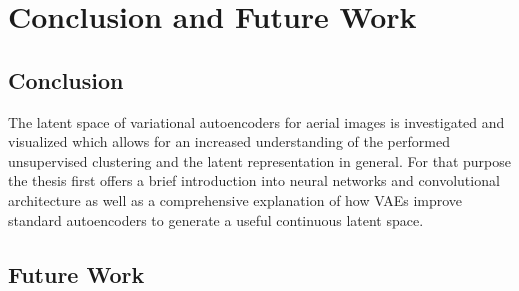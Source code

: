 \section{Conclusion and Future Work}
\subsection{Conclusion}

The latent space of variational autoencoders for aerial images is investigated and visualized 
which allows for an increased understanding of the performed unsupervised clustering and the 
latent representation in general. For that purpose the thesis first offers a brief introduction
into neural networks and convolutional architecture as well as a comprehensive explanation 
of how VAEs improve standard autoencoders to generate a useful continuous latent space. 


\subsection{Future Work}